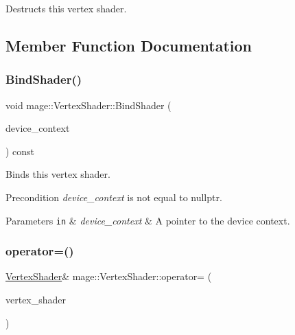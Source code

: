 Destructs this vertex shader. 

\subsection{Member Function Documentation}
\hypertarget{classmage_1_1_vertex_shader_a04001136e86576cefff14b6a6d79c2d4}{}\label{classmage_1_1_vertex_shader_a04001136e86576cefff14b6a6d79c2d4} 
\subsubsection{\texorpdfstring{Bind\+Shader()}{BindShader()}}
{\footnotesize\ttfamily void mage\+::\+Vertex\+Shader\+::\+Bind\+Shader (\begin{DoxyParamCaption}\item[{I\+D3\+D11\+Device\+Context2 $\ast$}]{device\+\_\+context }\end{DoxyParamCaption}) const\hspace{0.3cm}{\ttfamily [noexcept]}}

Binds this vertex shader.

\begin{DoxyPrecond}{Precondition}
{\itshape device\+\_\+context} is not equal to {\ttfamily nullptr}. 
\end{DoxyPrecond}

\begin{DoxyParams}[1]{Parameters}
\mbox{\tt in}  & {\em device\+\_\+context} & A pointer to the device context. \\
\hline
\end{DoxyParams}
\hypertarget{classmage_1_1_vertex_shader_a0094f5c2adb8377fa5c8d52e7a65136f}{}\label{classmage_1_1_vertex_shader_a0094f5c2adb8377fa5c8d52e7a65136f} 
\subsubsection{\texorpdfstring{operator=()}{operator=()}\hspace{0.1cm}{\footnotesize\ttfamily [1/2]}}
{\footnotesize\ttfamily \hyperlink{classmage_1_1_vertex_shader}{Vertex\+Shader}\& mage\+::\+Vertex\+Shader\+::operator= (\begin{DoxyParamCaption}\item[{const \hyperlink{classmage_1_1_vertex_shader}{Vertex\+Shader} \&}]{vertex\+\_\+shader }\end{DoxyParamCaption})\hspace{0.3cm}{\ttfamily [delete]}}

